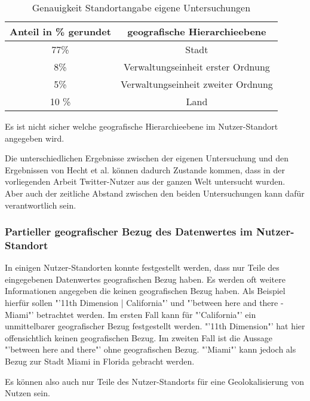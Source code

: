 				\begin{table}[htpb]
				\caption{Genauigkeit Standortangabe eigene Untersuchungen} 
				\centering
				\begin{tabular}{|c||c|}
					\hline
					Anteil in \% gerundet & geografische Hierarchieebene \\
					\hline\hline
					77\% & Stadt \\
					\hline
					8\% & Verwaltungseinheit erster Ordnung  \\
					\hline
					5\% & Verwaltungseinheit zweiter Ordnung  \\
					\hline
					10 \% & Land \\
					\hline
				\end{tabular}
				\label{tab:genauigkeitenEigene} 
				\end{table} 

				Es ist nicht sicher welche geografische Hierarchieebene im Nutzer-Standort angegeben wird. 

				Die unterschiedlichen Ergebnisse zwischen der eigenen Untersuchung und den Ergebnissen von Hecht et al. können dadurch Zustande kommen, dass in der vorliegenden Arbeit Twitter-Nutzer aus der ganzen Welt untersucht wurden.
				Aber auch der zeitliche Abstand zwischen den beiden Untersuchungen kann dafür verantwortlich sein.  



			\subsubsection{Partieller geografischer Bezug des Datenwertes im Nutzer-Standort} \label{subsec:partiellerGeografischerBezug} 

				In einigen Nutzer-Standorten konnte festgestellt werden, dass nur Teile des eingegebenen Datenwertes geografischen Bezug haben. 
				Es werden oft weitere Informationen angegeben die keinen geografischen Bezug haben. 
				Als Beispiel hierfür sollen "'11th Dimension | California"' und "'between here and there - Miami"' betrachtet werden.
				Im ersten Fall kann für "'California"' ein unmittelbarer geografischer Bezug festgestellt werden.
				"'11th Dimension"' hat hier offensichtlich keinen geografischen Bezug.
				Im zweiten Fall ist die Aussage "'between here and there"' ohne geografischen Bezug.
				"'Miami"' kann jedoch als Bezug zur Stadt Miami in Florida gebracht werden.
				
				Es können also auch nur Teile des Nutzer-Standorts für eine Geolokalisierung von Nutzen sein.

